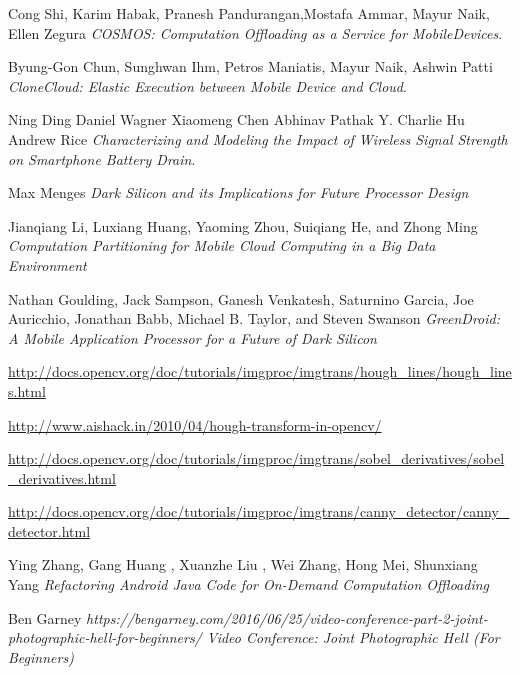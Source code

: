 \documentclass{sig-alternate}
\begin{document}
\begin{thebibliography}{2}

Cong Shi, Karim Habak, Pranesh Pandurangan,Mostafa Ammar, Mayur Naik, Ellen Zegura 
\textit{COSMOS: Computation Offloading as a Service for MobileDevices}. 

Byung-Gon Chun, Sunghwan Ihm, Petros Maniatis, Mayur Naik, Ashwin Patti
\textit{CloneCloud: Elastic Execution between Mobile Device and Cloud}. 

Ning Ding Daniel Wagner Xiaomeng Chen Abhinav Pathak Y. Charlie Hu Andrew Rice
\textit{Characterizing and Modeling the Impact of Wireless Signal Strength on Smartphone Battery Drain}.

Max Menges
\textit{Dark Silicon and its Implications for Future Processor Design}

Jianqiang Li, Luxiang Huang, Yaoming Zhou, Suiqiang He, and Zhong Ming
\textit{Computation Partitioning for Mobile Cloud Computing in a Big Data Environment}

Nathan Goulding, Jack Sampson, Ganesh Venkatesh, Saturnino Garcia, Joe Auricchio, Jonathan Babb, Michael B. Taylor, and Steven Swanson
\textit{GreenDroid: A Mobile Application Processor for a Future of Dark Silicon}

\url{http://docs.opencv.org/doc/tutorials/imgproc/imgtrans/hough_lines/hough_lines.html}

\url{http://www.aishack.in/2010/04/hough-transform-in-opencv/}

\url{http://docs.opencv.org/doc/tutorials/imgproc/imgtrans/sobel_derivatives/sobel_derivatives.html}

\url{http://docs.opencv.org/doc/tutorials/imgproc/imgtrans/canny_detector/canny_detector.html}

Ying Zhang, Gang Huang , Xuanzhe Liu , Wei Zhang, Hong Mei, Shunxiang Yang
\textit{Refactoring Android Java Code for On-Demand Computation Offloading}

Ben Garney
\textit{https://bengarney.com/2016/06/25/video-conference-part-2-joint-photographic-hell-for-beginners/ Video Conference: Joint Photographic Hell (For Beginners)}


\end{thebibliography}
\end{document}
